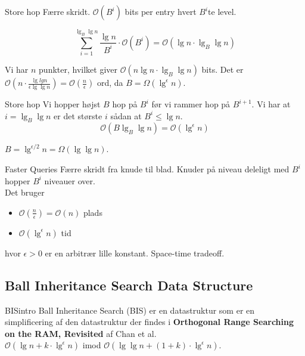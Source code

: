 \documentclass[pdf]{beamer}
\begin{document}
\begin{frame}{Store hop}
  Færre skridt. $\mathcal{O}(B^i)$ bits per entry hvert $B^i$te level.

  $$\sum_{i=1}^{\lg_B \lg n} \frac{\lg n}{B^i}\cdot\mathcal{O}(B^i) = \mathcal{O}(\lg n \cdot \lg_B \lg n)$$ 


  Vi har $n$ punkter, hvilket giver $\mathcal{O}(n\lg n \cdot\lg_B \lg n)$ bits. Det er $\mathcal{O}(n\cdot\frac{\lg lg n}{\epsilon \lg \lg n}) = \mathcal{O}(\frac{n}{\epsilon})$ ord, da $B = \Omega(\lg^\epsilon n)$.
\end{frame}

\begin{frame}{Store hop}
  Vi hopper højst $B$ hop på $B^i$ før vi rammer hop på $B^{i+1}$. Vi har at $i = \lg_B \lg n$ er det største $i$ sådan at $B^i \leq \lg n$. \\

  $$\mathcal{O}(B \lg_B \lg n) = \mathcal{O}(\lg^\epsilon n)$$


   $B = \lg^{\epsilon / 2} n = \Omega(\lg \lg n)$.
\end{frame}



\begin{frame}{Faster Queries}
  Færre skridt fra knude til blad. Knuder på niveau deleligt med $B^i$ hopper $B^i$ niveauer over. \\

  Det bruger
  \begin{itemize}
    \item $\mathcal{O}(\frac{n}{\epsilon}) = \mathcal{O}(n)$ plads
    \item $\mathcal{O}(\lg^\epsilon n)$ tid
  \end{itemize}
  hvor $\epsilon > 0$ er en arbitrær lille konstant. Space-time tradeoff.\\

\end{frame}

\subsection{Ball Inheritance Search Data Structure}

\begin{frame}{BISintro}
  Ball Inheritance Search (BIS) er en datastruktur som er en simplificering af den datastruktur der findes i \textbf{Orthogonal Range Searching on the RAM, Revisited}\cite{chanetal} af Chan et al.\\

  $\mathcal{O}(\lg n + k\cdot\lg^\epsilon n)$ imod $\mathcal{O}(\lg \lg n + (1+k)\cdot\lg^\epsilon n)$.

\end{frame}
\end{document}
